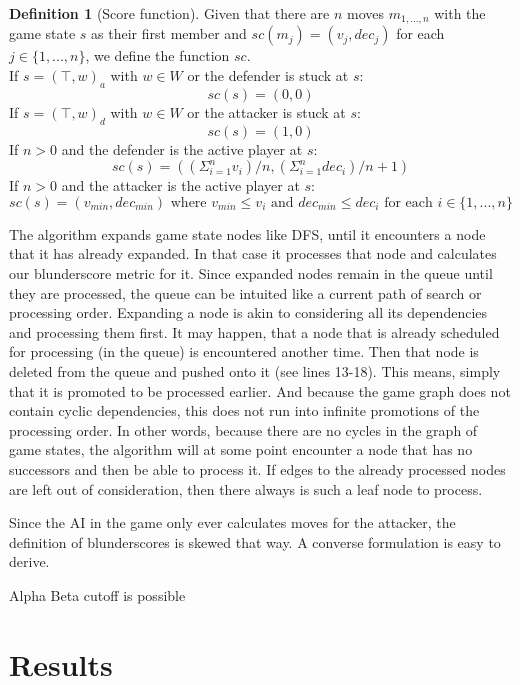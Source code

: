 \documentclass[a4paper,american,10pt]{paper}
\theoremstyle{definition}\newtheorem{definition}{Definition}
\begin{document}
\begin{definition}[Score function]
Given that there are $n$ moves $m_{1, ..., n}$ with the game state $s$ as their first member and $sc(m_j)=(v_j, dec_j)$ for each $j\in\{1, ..., n\}$, we define the function $sc$.\\
If  $s=(\top,w)_a$ with $w\in W$ or the defender is stuck at $s$:\\
\begin{equation}
sc(s)=(0, 0)
\end{equation}
If  $s=(\top,w)_d$ with $w\in W$ or the attacker is stuck at $s$:\\
\begin{equation}
sc(s)=(1, 0)
\end{equation}
If $n>0$ and the defender is the active player at $s$:\\
\begin{equation}
sc(s)=((\Sigma^n_{i=1}v_{i})/n, (\Sigma^n_{i=1}dec_{i})/n+1)
\end{equation}
If $n>0$ and the attacker is the active player at $s$:\\
\begin{equation}
sc(s)=(v_{min}, dec_{min})\text{ where }v_{min}\leq v_i\text{ and }dec_{min}\leq dec_i\text{ for each }i\in\{1,...,n\}
\end{equation}
\end{definition}
The algorithm expands game state nodes like DFS, until it encounters a node that it has already expanded. In that case it processes that node and calculates our blunderscore metric for it. Since expanded nodes remain in the queue until they are processed, the queue can be intuited like a current path of search or processing order. Expanding a node is akin to considering all its dependencies and processing them first. It may happen, that a node that is already scheduled for processing (in the queue) is encountered another time. Then that node is deleted from the queue and pushed onto it (see lines 13-18). This means, simply that it is promoted to be processed earlier. And because the game graph does not contain cyclic dependencies, this does not run into infinite promotions of the processing order. In other words, because there are no cycles in the graph of game states, the algorithm will at some point encounter a node that has no successors and then be able to process it. If edges to the already processed nodes are left out of consideration, then there always is such a leaf node to process.

Since the AI in the game only ever calculates moves for the attacker, the definition of blunderscores is skewed that way. A converse formulation is easy to derive.

Alpha Beta cutoff is possible

\section{Results}

\nocite{*}

\end{document}
